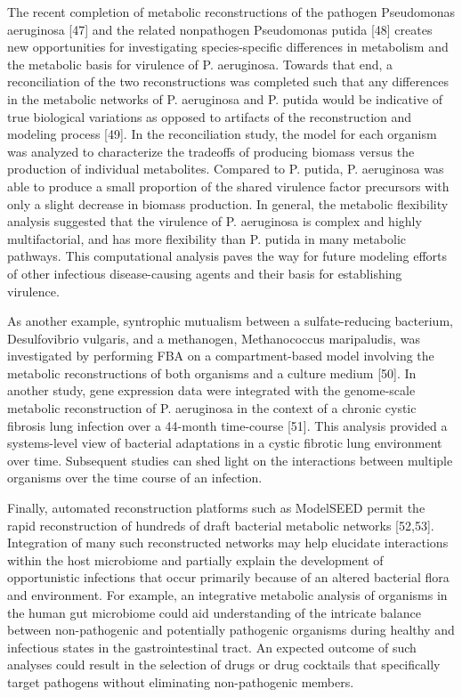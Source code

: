 The recent completion of metabolic reconstructions of the 
pathogen Pseudomonas aeruginosa [47] and the related nonpathogen 
Pseudomonas putida [48] creates new opportunities for 
investigating species-specific differences in metabolism 
and the metabolic basis for virulence of P. aeruginosa. 
Towards that end, a reconciliation of the two reconstructions 
was completed such that any differences in the metabolic 
networks of P. aeruginosa and P. putida would be indicative 
of true biological variations as opposed to artifacts of 
the reconstruction and modeling process [49]. In the reconciliation 
study, the model for each organism was analyzed to characterize 
the tradeoffs of producing biomass versus the production of 
individual metabolites. Compared to P. putida, P. aeruginosa 
was able to produce a small proportion of the shared virulence 
factor precursors with only a slight decrease in biomass 
production. In general, the metabolic flexibility analysis 
suggested that the virulence of P. aeruginosa is complex 
and highly multifactorial, and has more flexibility than 
P. putida in many metabolic pathways. This computational 
analysis paves the way for future modeling efforts of other 
infectious disease-causing agents and their basis for establishing 
virulence.

As another example, syntrophic mutualism between a sulfate-reducing 
bacterium, Desulfovibrio vulgaris, and a methanogen, Methanococcus 
maripaludis, was investigated by performing FBA on a compartment-based 
model involving the metabolic reconstructions of both organisms 
and a culture medium [50]. In another study, gene expression data 
were integrated with the genome-scale metabolic reconstruction of 
P. aeruginosa in the context of a chronic cystic fibrosis lung 
infection over a 44-month time-course [51]. This analysis provided 
a systems-level view of bacterial adaptations in a cystic fibrotic 
lung environment over time. Subsequent studies can shed light on 
the interactions between multiple organisms over the time course 
of an infection.

Finally, automated reconstruction platforms such as ModelSEED 
permit the rapid reconstruction of hundreds of draft bacterial 
metabolic networks [52,53]. Integration of many such reconstructed 
networks may help elucidate interactions within the host 
microbiome and partially explain the development of opportunistic 
infections that occur primarily because of an altered bacterial 
flora and environment. For example, an integrative metabolic 
analysis of organisms in the human gut microbiome could aid 
understanding of the intricate balance between non-pathogenic 
and potentially pathogenic organisms during healthy and 
infectious states in the gastrointestinal tract. An expected 
outcome of such analyses could result in the selection of 
drugs or drug cocktails that specifically target pathogens 
without eliminating non-pathogenic members.

